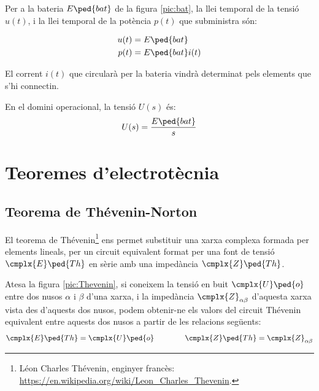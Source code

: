 Per a la bateria $E\ped{bat}$ de la figura
\vref{pic:bat}, la llei temporal de la tensió $u(t)$, i la llei temporal de la
potència $p(t)$ que subministra són:

\hfill
\begin{minipage}[b]{5cm}
	
	\label{pic:bat}
\end{minipage}
\hfill
\begin{minipage}[b][3cm][t]{8cm}
	\begin{align}
		u(t) &= E\ped{bat} \\  p(t) &= E\ped{bat} i(t)
	\end{align}
\end{minipage}


El corrent $i(t)$ que circularà per la bateria vindrà determinat
pels elements que s'hi connectin.

 En el domini operacional, la
tensió $U(s)$ és:
\begin{equation}
	U(s) = \frac{E\ped{bat}}{s}
\end{equation}



\section{Teoremes d'electrotècnia}\label{sec:teoremes}

\subsection{\texorpdfstring{Teorema de Thévenin-Norton}{Teorema de
            Thévenin-Norton}}\label{sec:T_N}

El teorema de Thévenin\footnote{Léon Charles Thévenin, enginyer francès:  \href{https://en.wikipedia.org/wiki/Leon_Charles_Thevenin}{https:/\!\!/en.wikipedia.org/wiki/Leon\_Charles\_Thevenin}.} ens permet
substituir una xarxa complexa formada per elements lineals, per un
circuit equivalent format per una font de tensió $\cmplx{E}\ped{Th}$
en sèrie amb una impedància $\cmplx{Z}\ped{Th}$.


Atesa la figura \vref{pic:Thevenin}, si coneixem la tensió en
buit $\cmplx{U}\ped{o}$ entre dos nusos $\alpha$ i $\beta$ d'una
xarxa, i la impedància $\cmplx{Z}_{\alpha\beta}$ d'aquesta xarxa
vista des d'aquests dos nusos, podem obtenir-ne els valors del circuit
Thévenin equivalent entre aquests dos nusos a partir de les
relacions següents:
\begin{equation}
   \cmplx{E}\ped{Th} = \cmplx{U}\ped{o} \qquad\qquad  \cmplx{Z}\ped{Th} = \cmplx{Z}_{\alpha\beta}
\end{equation}


